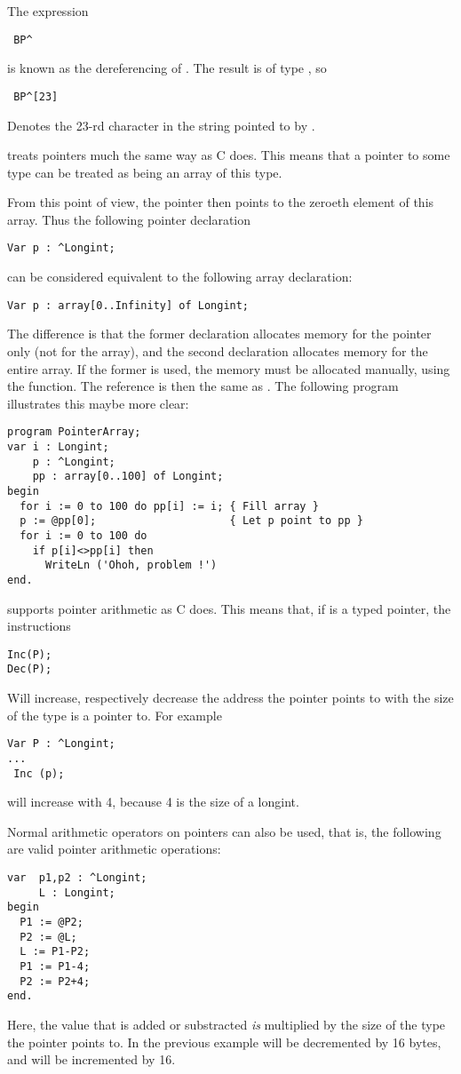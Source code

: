 The expression
\begin{verbatim}
 BP^
\end{verbatim}
is known as the dereferencing of . The result is of type , so
\begin{verbatim}
 BP^[23]
\end{verbatim}
Denotes the 23-rd character in the string pointed to by .
\begin{remark} \fpc treats pointers much the same way as C does. This means
that a pointer to some type can be treated as being an array of this type.

From this point of view, the pointer then points to the zeroeth element of this array. 
Thus the following pointer declaration
\begin{verbatim}
Var p : ^Longint;
\end{verbatim}
can be considered equivalent to the following array declaration:
\begin{verbatim}
Var p : array[0..Infinity] of Longint;
\end{verbatim}
The difference is that the former declaration allocates memory for the
pointer only (not for the array), and the second declaration allocates
memory for the entire array. If the former is used, the memory must be
allocated manually, using the  function.
The reference  is then the same as . The following program
illustrates this maybe more clear:
\begin{verbatim}
program PointerArray;
var i : Longint;
    p : ^Longint;
    pp : array[0..100] of Longint;
begin
  for i := 0 to 100 do pp[i] := i; { Fill array }
  p := @pp[0];                     { Let p point to pp }
  for i := 0 to 100 do
    if p[i]<>pp[i] then
      WriteLn ('Ohoh, problem !')
end.
\end{verbatim}
\end{remark}
\fpc supports pointer arithmetic as C does. This means that, if  is a
typed pointer, the instructions
\begin{verbatim}
Inc(P);
Dec(P);
\end{verbatim}
Will increase, respectively decrease the address the pointer points to
with the size of the type  is a pointer to. For example
\begin{verbatim}
Var P : ^Longint;
...
 Inc (p);
\end{verbatim}
will increase  with 4, because 4 is the size of a longint.

Normal arithmetic operators  on pointers can also be used, 
that is, the following are valid pointer arithmetic operations:
\begin{verbatim}
var  p1,p2 : ^Longint;
     L : Longint;
begin
  P1 := @P2;
  P2 := @L;
  L := P1-P2;
  P1 := P1-4;
  P2 := P2+4;
end.
\end{verbatim}
Here, the value that is added or substracted {\em is } multiplied by the
size of the type the pointer points to. In the previous
example  will be decremented by 16 bytes, and 
 will be incremented by 16.

